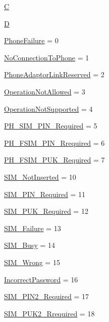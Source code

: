 \begin{DoxyCompactItemize}
\hyperlink{enum_8vala_aaa53ca0b650dfd85c4f59fa156f7a2cc}{C}
\item 
\hyperlink{enum_8vala_a350bfcb1e3cfb28ddff48ce525d4f139}{D}
\item 
\hyperlink{enum_8vala_a96e9dc13dbad210259144d31fb47d3d5}{Phone\-Failure} = 0
\item 
\hyperlink{enum_8vala_a3ae63a7c17bbbdb719add34f0b8e1d38}{No\-Connection\-To\-Phone} = 1
\item 
\hyperlink{enum_8vala_ad9f2ca814fd721e232c0641e1994be85}{Phone\-Adaptor\-Link\-Reserved} = 2
\item 
\hyperlink{enum_8vala_a40c3620637782663c2f6af59c8c9c7c5}{Operation\-Not\-Allowed} = 3
\item 
\hyperlink{enum_8vala_a6cbd4487c4f4d9103805f23686470287}{Operation\-Not\-Supported} = 4
\item 
\hyperlink{enum_8vala_aa0ceac08461d9cad90d55ffdfb29f8e5}{P\-H\-\_\-\-S\-I\-M\-\_\-\-P\-I\-N\-\_\-\-Required} = 5
\item 
\hyperlink{enum_8vala_a1457f75c0f7109bb7907ffae585c5015}{P\-H\-\_\-\-F\-S\-I\-M\-\_\-\-P\-I\-N\-\_\-\-Rrequired} = 6
\item 
\hyperlink{enum_8vala_a8a97629ce7708d97a94a4dd990de9365}{P\-H\-\_\-\-F\-S\-I\-M\-\_\-\-P\-U\-K\-\_\-\-Required} = 7
\item 
\hyperlink{enum_8vala_aa983269142921e1131672202497b42fa}{S\-I\-M\-\_\-\-Not\-Inserted} = 10
\item 
\hyperlink{enum_8vala_ac32ec0074905a7fe6125977d2832b315}{S\-I\-M\-\_\-\-P\-I\-N\-\_\-\-Required} = 11
\item 
\hyperlink{enum_8vala_aa14647c16d05501e1313711217d9b7d8}{S\-I\-M\-\_\-\-P\-U\-K\-\_\-\-Required} = 12
\item 
\hyperlink{enum_8vala_a6273256017f3c0a00bdae335404c766f}{S\-I\-M\-\_\-\-Failure} = 13
\item 
\hyperlink{enum_8vala_abf2032fefc96dc683f80703ccc2a504d}{S\-I\-M\-\_\-\-Busy} = 14
\item 
\hyperlink{enum_8vala_a4fa6993a5c6ee09f022aa77400312d3e}{S\-I\-M\-\_\-\-Wrong} = 15
\item 
\hyperlink{enum_8vala_a7099da7ea6db5fb7ba2e9d0a9df6d029}{Incorrect\-Password} = 16
\item 
\hyperlink{enum_8vala_a36a47f9fbac52f40c6e63e71601b3157}{S\-I\-M\-\_\-\-P\-I\-N2\-\_\-\-Required} = 17
\item 
\hyperlink{enum_8vala_a6e9725f3335efd3c0a5ef457171ea57c}{S\-I\-M\-\_\-\-P\-U\-K2\-\_\-\-Rrequired} = 18
\item 

\end{DoxyCompactItemize}
